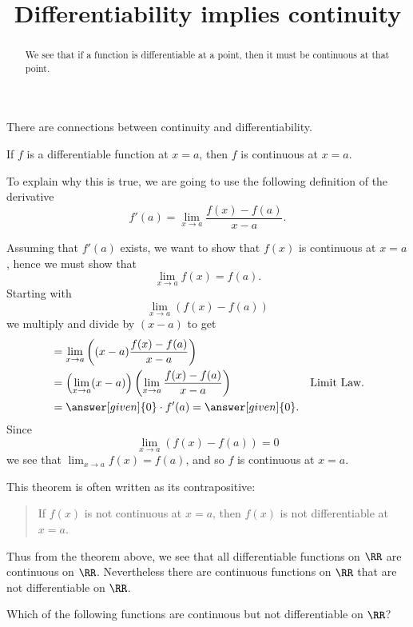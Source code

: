 \documentclass{ximera}
\title[Dig-In:]{Differentiability implies continuity}
\begin{document}
\begin{abstract}
We see that if a function is differentiable at a point, then it must
be continuous at that point.
\end{abstract}
\maketitle

There are connections between continuity and differentiability.

\begin{theorem}
If $f$ is a differentiable function at $x = a$, then $f$ is continuous
at $x=a$.
\begin{explanation}
To explain why this is true, we are going to use the following
definition of the derivative
\[
f'(a) = \lim_{x\to a} \frac{f(x)-f(a)}{x-a}.
\]

  Assuming that $f'(a)$ exists, we want to show that $f(x)$ is
continuous at $x=a$, hence we must show that
\[
\lim_{x\to a} f(x) = f(a).
\]
Starting with
\[
\lim_{x\to a} \left(f(x) - f(a)\right)
\]
we multiply and divide by $(x-a)$ to get
\begin{align*}
  &= \lim_{x\to a} \left((x-a)\frac{f(x) - f(a)}{x-a}\right) \\
  &= \left(\lim_{x\to a} (x-a) \right) \left(\lim_{x\to a}\frac{f(x) - f(a)}{x-a}\right) &\text{Limit Law.} \\
  &= \answer[given]{0}\cdot f'(a) = \answer[given]{0}.
\end{align*}
Since 
\[
\lim_{x\to a}\left(f(x) - f(a)\right) = 0 
\]
we see that $\lim_{x\to a} f(x) = f(a)$, and so $f$ is continuous at
$x=a$.
\end{explanation}
\end{theorem}

This theorem is often written as its contrapositive:
\begin{quote}
If $f(x)$ is not continuous at $x=a$, then $f(x)$ is not
differentiable at $x=a$.
\end{quote}


Thus from the theorem above, we see that all differentiable functions
on $\RR$ are continuous on $\RR$. Nevertheless there are continuous
functions on $\RR$ that are not differentiable on $\RR$.

\begin{question}
  Which of the following functions are continuous but not
  differentiable on $\RR$?
  \begin{selectAll}
  \end{selectAll}
\end{question}
\end{document}
